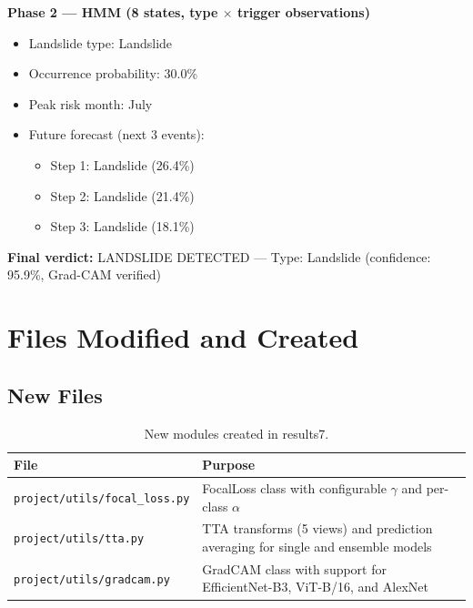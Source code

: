 \documentclass[11pt]{article}
\begin{document}
\vspace{0.3cm}
\noindent \textbf{Phase 2 --- HMM (8 states, type $\times$ trigger observations)}
\begin{itemize}[noitemsep]
    \item Landslide type: Landslide
    \item Occurrence probability: 30.0\%
    \item Peak risk month: July
    \item Future forecast (next 3 events):
    \begin{itemize}
        \item Step 1: Landslide (26.4\%)
        \item Step 2: Landslide (21.4\%)
        \item Step 3: Landslide (18.1\%)
    \end{itemize}
\end{itemize}

\noindent \textbf{Final verdict:} LANDSLIDE DETECTED --- Type: Landslide (confidence: 95.9\%, Grad-CAM verified)

\section{Files Modified and Created}

\subsection{New Files}

\begin{table}[H]
\centering
\renewcommand{\arraystretch}{1.2}
\begin{tabularx}{\textwidth}{lX}
\toprule
\textbf{File} & \textbf{Purpose} \\
\midrule
\texttt{project/utils/focal\_loss.py}  & FocalLoss class with configurable $\gamma$ and per-class $\alpha$ \\
\texttt{project/utils/tta.py}          & TTA transforms (5 views) and prediction averaging for single and ensemble models \\
\texttt{project/utils/gradcam.py}      & GradCAM class with support for EfficientNet-B3, ViT-B/16, and AlexNet \\
\bottomrule
\end{tabularx}
\caption{New modules created in results7.}
\end{table}
\end{document}
